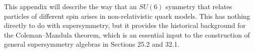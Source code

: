 
This appendix will describe the way that an $SU(6)$ symmetry that relates
particles of different spin arises in non-relativistic quark models. This has
nothing directly to do with supersymmetry, but it provides the historical
background for the Coleman--Mandula theorem, which is an essential input to the
construction of general supersymmetry algebras in Sections 25.2 and 32.1.

